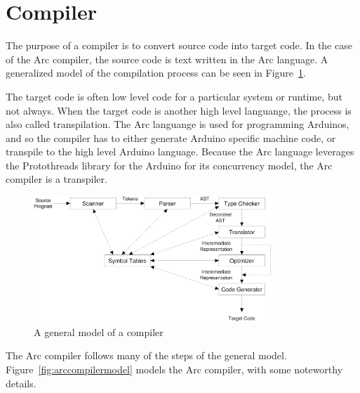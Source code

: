\section{Compiler}\label{sec:compiler}
The purpose of a compiler is to convert source code into target code. In the case of the Arc compiler, the source code is text written in the Arc language. A generalized model of the compilation process can be seen in Figure~\ref{fig:generalcompilermodel}.

The target code is often low level code for a particular system or runtime, but not always. When the target code is another high level languange, the process is also called transpilation. The Arc languange is used for programming Arduinos, and so the compiler has to either generate Arduino specific machine code, or transpile to the high level Arduino language. Because the Arc language leverages the Protothreads library for the Arduino for its concurrency model, the Arc compiler is a transpiler.


\begin{figure}[htb!]
    \centering
    \includegraphics[width=0.8\textwidth]{figures/Full_Compiler.png}
    \caption{A general model of a compiler~\cite{CraftingCompiler}}
    \label{fig:generalcompilermodel}
\end{figure}


The Arc compiler follows many of the steps of the general model. Figure~\ref{fig:arccompilermodel} models the Arc compiler, with some noteworthy details.

